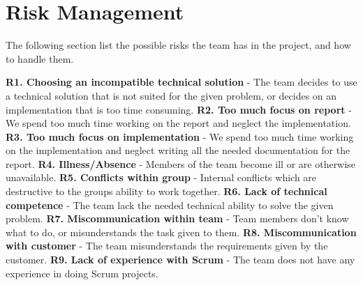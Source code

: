 \section{Risk Management}
The following section list the possible risks the team has in the project, and how to handle them.

\textbf{R1. Choosing an incompatible technical solution} - The team decides to use a technical solution that is not suited for the given problem, or decides on an implementation that is too time consuming. \newline
\textbf{R2. Too much focus on report} -  We spend too much time working on the report and neglect the implementation. \newline
\textbf{R3. Too much focus on implementation} - We spend too much time working on the implementation and neglect writing all the needed documentation for the report. \newline
\textbf{R4. Illness/Absence} - Members of the team become ill or are otherwise unavailable. \newline
\textbf{R5. Conflicts within group} - Internal conflicts which are destructive to the groups ability to work together. \newline
\textbf{R6. Lack of technical competence} - The team lack the needed technical ability to solve the given problem. \newline
\textbf{R7. Miscommunication within team} - Team members don’t know what to do, or misunderstands the task given to them. \newline
\textbf{R8. Miscommunication with customer} - The team misunderstands the requirements given by the customer. \newline
\textbf{R9. Lack of experience with Scrum} - The team does not have any experience in doing Scrum projects. \newline

